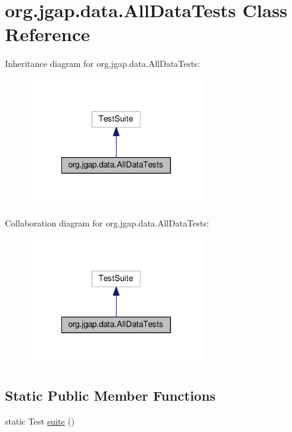 \hypertarget{classorg_1_1jgap_1_1data_1_1_all_data_tests}{\section{org.\-jgap.\-data.\-All\-Data\-Tests Class Reference}
\label{classorg_1_1jgap_1_1data_1_1_all_data_tests}
}


Inheritance diagram for org.\-jgap.\-data.\-All\-Data\-Tests\-:
\nopagebreak
\begin{figure}[H]
\begin{center}
\leavevmode
\includegraphics[width=212pt]{classorg_1_1jgap_1_1data_1_1_all_data_tests__inherit__graph}
\end{center}
\end{figure}


Collaboration diagram for org.\-jgap.\-data.\-All\-Data\-Tests\-:
\nopagebreak
\begin{figure}[H]
\begin{center}
\leavevmode
\includegraphics[width=212pt]{classorg_1_1jgap_1_1data_1_1_all_data_tests__coll__graph}
\end{center}
\end{figure}
\subsection*{Static Public Member Functions}
\begin{DoxyCompactItemize}
\item 
static Test \hyperlink{classorg_1_1jgap_1_1data_1_1_all_data_tests_abd2ce9315a6850e1bb3c85a03142e591}{suite} ()
\end{DoxyCompactItemize}
